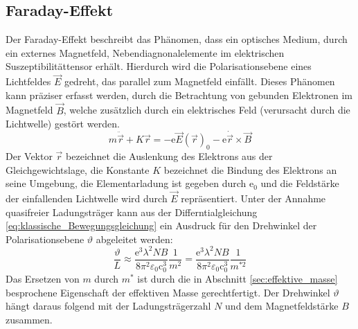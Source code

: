 \subsection{Faraday-Effekt}
Der Faraday-Effekt beschreibt das Phänomen, dass ein optisches
Medium, durch ein externes Magnetfeld, Nebendiagnonalelemente im elektrischen Suszeptibilitättensor erhält.
Hierdurch wird die Polarisationsebene eines Lichtfeldes $\vec{E}$ gedreht, das parallel zum Magnetfeld einfällt.
Dieses Phänomen kann präziser erfasst werden, durch die Betrachtung von gebunden Elektronen im Magnetfeld $\vec{B}$, welche zusätzlich durch ein elektrisches Feld (verursacht durch die Lichtwelle) gestört werden.
\begin{equation}
  \label{eq:klassische_Bewegungsgleichung}
  m\ddot{\vec{r}}+K\vec{r}=-\text{e}\vec{E}(\vec{r})_0-\text{e}\dot{\vec{r}}\times\vec{B}
\end{equation}
Der Vektor $\vec{r}$ bezeichnet die Auslenkung des Elektrons aus der Gleichgewichtslage, die Konstante $K$ bezeichnet die Bindung des Elektrons an seine Umgebung, die Elementarladung
ist gegeben durch $\text{e}_0$ und die Feldstärke der einfallenden Lichtwelle
wird durch $\vec{E}$ repräsentiert.
Unter der Annahme quasifreier Ladungsträger kann
aus der Differntialgleichung \eqref{eq:klassische_Bewegungsgleichung} ein Ausdruck
für den Drehwinkel der Polarisationsebene $\vartheta$ abgeleitet werden:
\begin{equation}
  \label{eq:drehwinkel}
  \frac{\vartheta}{L}\approx \frac{\text{e}^3\lambda^2 NB}{8\pi^2\varepsilon_0\text{c}_0^3}\frac{1}{m^2} = \frac{\text{e}^3\lambda^2 NB}{8\pi^2\varepsilon_0\text{c}_0^3}\frac{1}{m^{*2}}
\end{equation}
Das Ersetzen von $m$ durch $m^*$ ist durch die in Abschnitt \ref{sec:effektive_masse}
besprochene Eigenschaft der effektiven Masse gerechtfertigt.
Der Drehwinkel $\vartheta$ hängt daraus folgend mit der Ladungsträgerzahl $N$ und dem Magnetfeldstärke $B$ zusammen.
